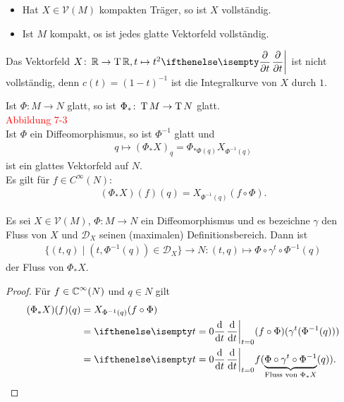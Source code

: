 \begin{kor}\hfill
  \begin{itemize}
  \item Hat $X \in \mathcal V(M)$ kompakten Träger, so ist $X$ vollständig.
  \item Ist $M$ kompakt, os ist jedes glatte Vektorfeld vollständig.
  \end{itemize}
\end{kor}

\begin{bsp}
  Das Vektorfeld $X \colon \R \to \T\R, t \mapsto t^2\pdifffrac{}{t}$ ist nicht vollständig, denn $c(t) = (1-t)^{-1}$ ist die Integralkurve von $X$ durch $1$.
\end{bsp}


\begin{bem*}
  Ist $\Phi \colon M \to N$ glatt, so ist $\Phi_{\ast} \colon \operatorname{T} M \to \operatorname{T} N$ glatt.\\
  \textcolor{red}{Abbildung 7-3}\\
Ist $\Phi$ ein Diffeomorphismus, so ist $\Phi^{-1}$ glatt und 
\begin{align*}
  q \mapsto (\Phi_{\ast}X)_q = \Phi_{*\Phi(q)}X_{\Phi^{-1}(q)}
\end{align*}
ist ein glattes Vektorfeld auf $N$.\\
Es gilt für $f \in C^{\infty}(N)$:
\begin{align*}
  (\Phi_{\ast}X)(f)(q) = X_{\Phi^{-1}(q)}(f \circ \Phi).
\end{align*}
\end{bem*}


\begin{lemma}
  Es sei $X \in \mathcal V(M)$, $\Phi \colon M \to N$ ein Diffeomorphismus und es bezeichne $\gamma$ den Fluss von $X$ und $\mathcal D_X$ seinen (maximalen) Definitionsbereich.
Dann ist
\begin{align*}
  \{(t,q) \mid (t,\Phi^{-1}(q)) \in \mathcal D_X\} \to N \colon (t,q) \mapsto \Phi \circ \gamma^t \circ \Phi^{-1}(q)
\end{align*} 
der Fluss von $\Phi_{*}X$.
\end{lemma}

\begin{proof}
 Für $f \in \operatorname{\mathbb{C}}^{\infty}(N)$ und $q \in N$ gilt
 \begin{align*}
   (\Phi_{\ast}X)(f)(q) & = X_{\Phi^{-1}(q)}(f \circ \Phi)\\
   & = \difffrac[t=0]{}{t} (f \circ \Phi)(\gamma^t(\Phi^{-1}(q)))\\
   & = \difffrac[t=0]{}{t}f(\underbrace{\Phi \circ \gamma^t \circ \Phi^{-1}}_{\text{Fluss von }\Phi_{*}X}(q)).
 \end{align*}
\end{proof}

